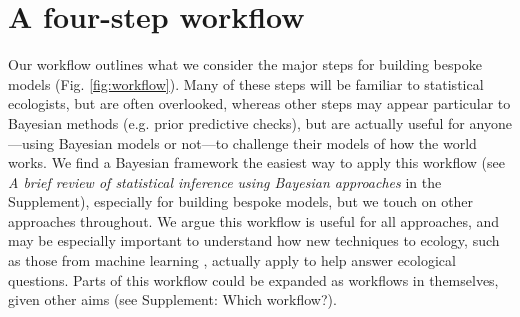 \documentclass[11pt]{article}
\begin{document}

\section*{A four-step workflow}

Our workflow outlines what we consider the major steps for building bespoke models (Fig. \ref{fig:workflow}). Many of these steps will be familiar to statistical ecologists, but are often overlooked, whereas other steps may appear particular to Bayesian methods (e.g. prior predictive checks), but are actually useful for anyone---using Bayesian models or not---to challenge their models of how the world works. We find a Bayesian framework the easiest way to apply this workflow (see \emph{A brief review of statistical inference using Bayesian approaches} in the Supplement), especially for building bespoke models, but we touch on other approaches throughout. We argue this workflow is useful for all approaches, and may be especially important to understand how new techniques to ecology, such as those from machine learning \citep{pichler2023machine}, actually apply to help answer ecological questions. %
Parts of this workflow could be expanded as workflows in themselves, given other aims (see Supplement: Which workflow?). %
\end{document}
